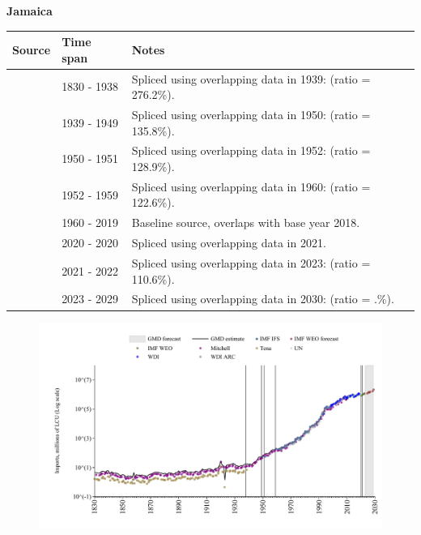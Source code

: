 \documentclass[12pt,a4paper,landscape]{article}
\begin{document}
\begin{adjustbox}{max totalsize={\paperwidth}{\paperheight},center}
\begin{minipage}[t][\textheight][t]{\textwidth}
\vspace*{0.5cm}
{}
\begin{center}
{\Large\bfseries Jamaica}
\end{center}
\vspace{0.5cm}
\begin{table}[H]
\centering
\small
\begin{tabular}{|l|l|l|}
\hline
\textbf{Source} & \textbf{Time span} & \textbf{Notes} \\
\hline
\rowcolor{white}\cite{Tena}& 1830 - 1938 &Spliced using overlapping data in 1939: (ratio = 276.2\%).\\
\rowcolor{lightgray}\cite{Mitchell}& 1939 - 1949 &Spliced using overlapping data in 1950: (ratio = 135.8\%).\\
\rowcolor{white}\cite{IMF_IFS}& 1950 - 1951 &Spliced using overlapping data in 1952: (ratio = 128.9\%).\\
\rowcolor{lightgray}\cite{Mitchell}& 1952 - 1959 &Spliced using overlapping data in 1960: (ratio = 122.6\%).\\
\rowcolor{white}\cite{WDI}& 1960 - 2019 &Baseline source, overlaps with base year 2018.\\
\rowcolor{lightgray}\cite{UN}& 2020 - 2020 &Spliced using overlapping data in 2021.\\
\rowcolor{white}\cite{IMF_WEO}& 2021 - 2022 &Spliced using overlapping data in 2023: (ratio = 110.6\%).\\
\rowcolor{lightgray}\cite{IMF_WEO_forecast}& 2023 - 2029 &Spliced using overlapping data in 2030: (ratio = .\%).\\
\hline
\end{tabular}
\end{table}
\begin{figure}[H]
\centering
\includegraphics[width=\textwidth,height=0.6\textheight,keepaspectratio]{graphs/JAM_imports.pdf}
\end{figure}
\end{minipage}
\end{adjustbox}
\end{document}
